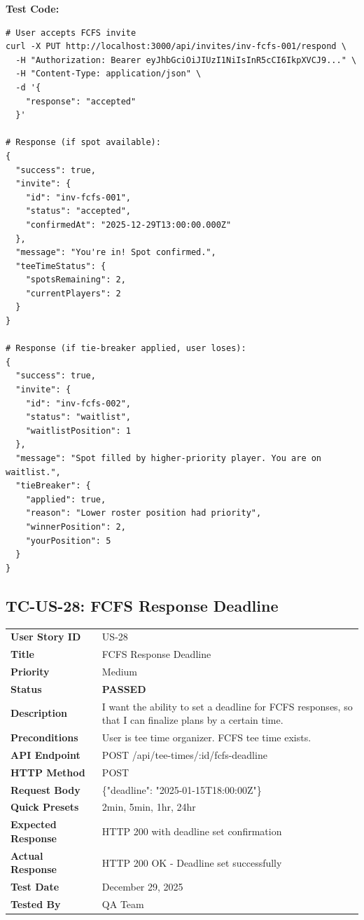 \documentclass[11pt,a4paper]{article}
\newcommand{\passed}{\textcolor{pass}{\textbf{PASSED}}}
\begin{document}
\vspace{0.3cm}
\textbf{Test Code:}
\begin{lstlisting}
# User accepts FCFS invite
curl -X PUT http://localhost:3000/api/invites/inv-fcfs-001/respond \
  -H "Authorization: Bearer eyJhbGciOiJIUzI1NiIsInR5cCI6IkpXVCJ9..." \
  -H "Content-Type: application/json" \
  -d '{
    "response": "accepted"
  }'

# Response (if spot available):
{
  "success": true,
  "invite": {
    "id": "inv-fcfs-001",
    "status": "accepted",
    "confirmedAt": "2025-12-29T13:00:00.000Z"
  },
  "message": "You're in! Spot confirmed.",
  "teeTimeStatus": {
    "spotsRemaining": 2,
    "currentPlayers": 2
  }
}

# Response (if tie-breaker applied, user loses):
{
  "success": true,
  "invite": {
    "id": "inv-fcfs-002",
    "status": "waitlist",
    "waitlistPosition": 1
  },
  "message": "Spot filled by higher-priority player. You are on waitlist.",
  "tieBreaker": {
    "applied": true,
    "reason": "Lower roster position had priority",
    "winnerPosition": 2,
    "yourPosition": 5
  }
}
\end{lstlisting}

\vspace{0.5cm}


\subsection{TC-US-28: FCFS Response Deadline}

\begin{tabularx}{\textwidth}{|p{3.2cm}|Y|}
\hline
{}
 \\
\hline
\textbf{User Story ID} & US-28 \\
\hline
\textbf{Title} & FCFS Response Deadline \\
\hline
\textbf{Priority} & Medium \\
\hline
\textbf{Status} & \passed \\
\hline
\textbf{Description} & I want the ability to set a deadline for FCFS responses, so that I can finalize plans by a certain time. \\
\hline
\textbf{Preconditions} & User is tee time organizer. FCFS tee time exists. \\
\hline
\textbf{API Endpoint} & POST /api/tee-times/:id/fcfs-deadline \\
\hline
\textbf{HTTP Method} & POST \\
\hline
\textbf{Request Body} & \{"deadline": "2025-01-15T18:00:00Z"\} \\
\hline
\textbf{Quick Presets} & 2min, 5min, 1hr, 24hr \\
\hline
\textbf{Expected Response} & HTTP 200 with deadline set confirmation \\
\hline
\textbf{Actual Response} & HTTP 200 OK - Deadline set successfully \\
\hline
\textbf{Test Date} & December 29, 2025 \\
\hline
\textbf{Tested By} & QA Team \\
\hline
\end{tabularx}
\end{document}
